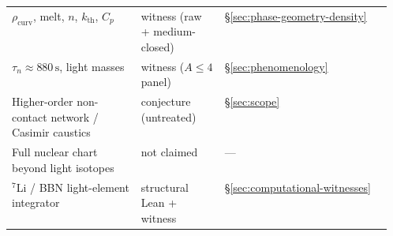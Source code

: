 \documentclass[11pt,notitlepage]{amsart}
\begin{document}
\begin{table}[h]
{\begin{tabularx}{\linewidth}{@{}>{\RaggedRight\arraybackslash}p{0.34\linewidth}>{\RaggedRight\arraybackslash}p{0.22\linewidth}X@{}}
$\rho_{\mathrm{curv}}$, melt, $n$, $k_{\mathrm{th}}$, $C_p$ & witness (raw + medium-closed) & \S\ref{sec:phase-geometry-density} \\
$\tau_n\approx 880\,\mathrm{s}$, light masses & witness ($A\le 4$ panel) & \S\ref{sec:phenomenology} \\
Higher-order non-contact network / Casimir caustics & conjecture (untreated) & \S\ref{sec:scope} \\
Full nuclear chart beyond light isotopes & not claimed & --- \\
$^7$Li / BBN light-element integrator & structural Lean + witness & \S\ref{sec:computational-witnesses} \\
\bottomrule
\end{tabularx}}
\end{table}
\end{document}
